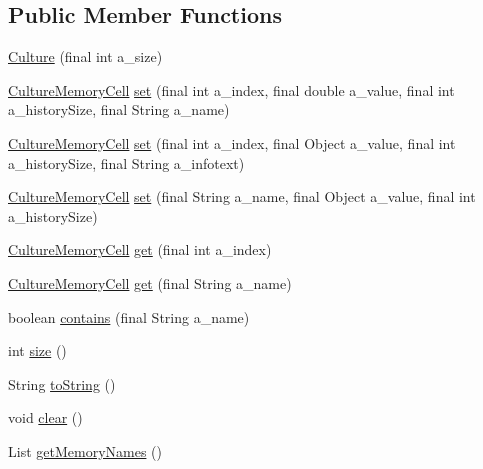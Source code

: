 \subsection*{Public Member Functions}
\begin{DoxyCompactItemize}
\item 
\hyperlink{classorg_1_1jgap_1_1distr_1_1_culture_a469d2fd0c8367d7003b6600303accf0b}{Culture} (final int a\-\_\-size)
\item 
\hyperlink{classorg_1_1jgap_1_1distr_1_1_culture_memory_cell}{Culture\-Memory\-Cell} \hyperlink{classorg_1_1jgap_1_1distr_1_1_culture_ab4d319d73cad8a5d646e71d42fcc5707}{set} (final int a\-\_\-index, final double a\-\_\-value, final int a\-\_\-history\-Size, final String a\-\_\-name)
\item 
\hyperlink{classorg_1_1jgap_1_1distr_1_1_culture_memory_cell}{Culture\-Memory\-Cell} \hyperlink{classorg_1_1jgap_1_1distr_1_1_culture_a218cca3519f20fe77aa89376a77bd515}{set} (final int a\-\_\-index, final Object a\-\_\-value, final int a\-\_\-history\-Size, final String a\-\_\-infotext)
\item 
\hyperlink{classorg_1_1jgap_1_1distr_1_1_culture_memory_cell}{Culture\-Memory\-Cell} \hyperlink{classorg_1_1jgap_1_1distr_1_1_culture_a2a2149eb5806381ba9b7a5b011b4a950}{set} (final String a\-\_\-name, final Object a\-\_\-value, final int a\-\_\-history\-Size)
\item 
\hyperlink{classorg_1_1jgap_1_1distr_1_1_culture_memory_cell}{Culture\-Memory\-Cell} \hyperlink{classorg_1_1jgap_1_1distr_1_1_culture_a0a9869c4e1d2a9e0705d0b302aef90c3}{get} (final int a\-\_\-index)
\item 
\hyperlink{classorg_1_1jgap_1_1distr_1_1_culture_memory_cell}{Culture\-Memory\-Cell} \hyperlink{classorg_1_1jgap_1_1distr_1_1_culture_ae557d0867a52b92759607b6c1adf9741}{get} (final String a\-\_\-name)
\item 
boolean \hyperlink{classorg_1_1jgap_1_1distr_1_1_culture_a02665935d911c89518d1f78fd80ba492}{contains} (final String a\-\_\-name)
\item 
int \hyperlink{classorg_1_1jgap_1_1distr_1_1_culture_ae957752df677c46b1ce7d2d7cd1fb4ff}{size} ()
\item 
String \hyperlink{classorg_1_1jgap_1_1distr_1_1_culture_a1fd0d0576d8ee0c5700315b819bc007d}{to\-String} ()
\item 
void \hyperlink{classorg_1_1jgap_1_1distr_1_1_culture_a733664db51253ba2d47e6895a535cdcc}{clear} ()
\item 
List \hyperlink{classorg_1_1jgap_1_1distr_1_1_culture_af0aa67ed30955a503a5d35cadc8d4ba9}{get\-Memory\-Names} ()

\end{DoxyCompactItemize}
